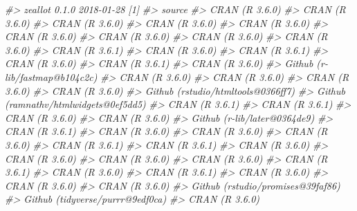 \documentclass[
  12pt,
]{krantz}
\newenvironment{Shaded}{\begin{snugshade}}{\end{snugshade}}
\newcommand{\CommentTok}[1]{\textcolor[rgb]{0.56,0.35,0.01}{\textit{#1}}}
\begin{document}
\begin{Shaded}
\begin{Highlighting}[]
\CommentTok{#>  zeallot        0.1.0      2018-01-28 [1]}
\CommentTok{#>  source                               }
\CommentTok{#>  CRAN (R 3.6.0)                       }
\CommentTok{#>  CRAN (R 3.6.0)                       }
\CommentTok{#>  CRAN (R 3.6.0)                       }
\CommentTok{#>  CRAN (R 3.6.0)                       }
\CommentTok{#>  CRAN (R 3.6.0)                       }
\CommentTok{#>  CRAN (R 3.6.0)                       }
\CommentTok{#>  CRAN (R 3.6.0)                       }
\CommentTok{#>  CRAN (R 3.6.0)                       }
\CommentTok{#>  CRAN (R 3.6.0)                       }
\CommentTok{#>  CRAN (R 3.6.1)                       }
\CommentTok{#>  CRAN (R 3.6.0)                       }
\CommentTok{#>  CRAN (R 3.6.1)                       }
\CommentTok{#>  CRAN (R 3.6.0)                       }
\CommentTok{#>  CRAN (R 3.6.1)                       }
\CommentTok{#>  CRAN (R 3.6.0)                       }
\CommentTok{#>  Github (r-lib/fastmap@b104c2c)       }
\CommentTok{#>  CRAN (R 3.6.0)                       }
\CommentTok{#>  CRAN (R 3.6.0)                       }
\CommentTok{#>  CRAN (R 3.6.0)                       }
\CommentTok{#>  CRAN (R 3.6.0)                       }
\CommentTok{#>  Github (rstudio/htmltools@0366ff7)   }
\CommentTok{#>  Github (ramnathv/htmlwidgets@0ef5dd5)}
\CommentTok{#>  CRAN (R 3.6.1)                       }
\CommentTok{#>  CRAN (R 3.6.1)                       }
\CommentTok{#>  CRAN (R 3.6.0)                       }
\CommentTok{#>  CRAN (R 3.6.0)                       }
\CommentTok{#>  Github (r-lib/later@0364de9)         }
\CommentTok{#>  CRAN (R 3.6.1)                       }
\CommentTok{#>  CRAN (R 3.6.0)                       }
\CommentTok{#>  CRAN (R 3.6.0)                       }
\CommentTok{#>  CRAN (R 3.6.0)                       }
\CommentTok{#>  CRAN (R 3.6.1)                       }
\CommentTok{#>  CRAN (R 3.6.1)                       }
\CommentTok{#>  CRAN (R 3.6.0)                       }
\CommentTok{#>  CRAN (R 3.6.0)                       }
\CommentTok{#>  CRAN (R 3.6.0)                       }
\CommentTok{#>  CRAN (R 3.6.0)                       }
\CommentTok{#>  CRAN (R 3.6.1)                       }
\CommentTok{#>  CRAN (R 3.6.0)                       }
\CommentTok{#>  CRAN (R 3.6.1)                       }
\CommentTok{#>  CRAN (R 3.6.0)                       }
\CommentTok{#>  CRAN (R 3.6.0)                       }
\CommentTok{#>  CRAN (R 3.6.0)                       }
\CommentTok{#>  Github (rstudio/promises@39faf86)    }
\CommentTok{#>  Github (tidyverse/purrr@9edf0ca)     }
\CommentTok{#>  CRAN (R 3.6.0)                       }

\end{Highlighting}
\end{Shaded}
\end{document}
